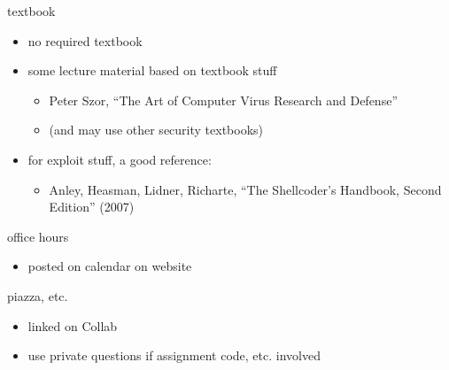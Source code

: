 \begin{frame}{textbook}
\begin{itemize}
    \item no required textbook
    \vspace{.5cm}
    \item some lecture material based on textbook stuff
        \begin{itemize}
        \item Peter Szor, ``The Art of Computer Virus Research and Defense''
        \item (and may use other security textbooks)
        \end{itemize}
    \item for exploit stuff, a good reference:
        \begin{itemize}
        \item Anley, Heasman, Lidner, Richarte, ``The Shellcoder's Handbook, Second Edition'' (2007)
        \end{itemize}
    \end{itemize}
\end{frame}

\begin{frame}{office hours}
    \begin{itemize}
    \item posted on calendar on website
    \end{itemize}
\end{frame}

\begin{frame}{piazza, etc.}
    \begin{itemize}
    \item linked on Collab
    \vspace{.5cm}
    \item use private questions if assignment code, etc. involved
    \end{itemize}
\end{frame}

